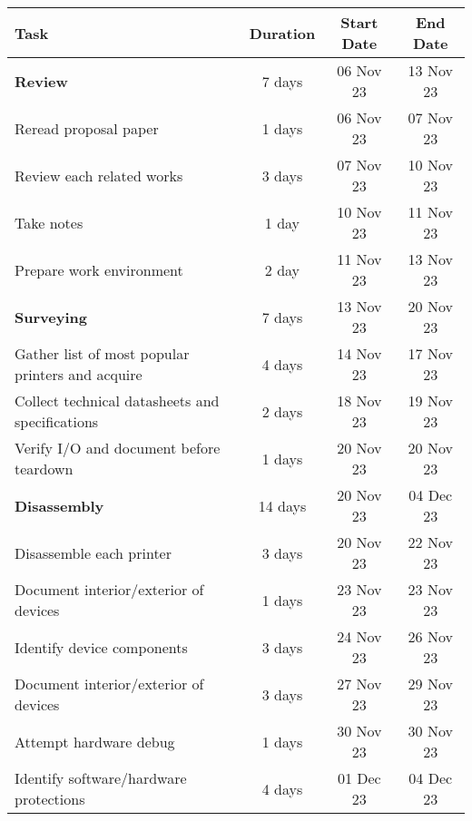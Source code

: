 \begin{table}[h]
  \centering
  \begin{tabular}{ |l||c|c|c| }
    \hline\rowcolor{gray!30}

    \textbf{Task} & \textbf{Duration} & \textbf{Start Date} & \textbf{End Date} \\
  
    \hline


    \hline\rowcolor{gray!10} 

    \textbf{Review} & 7 days & 06 Nov 23 & 13 Nov 23 \\

    Reread proposal paper & 1 days & 06 Nov 23 & 07 Nov 23 \\
    Review each related works & 3 days & 07 Nov 23 & 10 Nov 23 \\
    Take notes & 1 day & 10 Nov 23 & 11 Nov 23 \\
    Prepare work environment & 2 day & 11 Nov 23 & 13 Nov 23 \\

    \hline
    \hline\rowcolor{gray!10} 

    \textbf{Surveying} & 7 days & 13 Nov 23 & 20 Nov 23 \\

    Gather list of most popular printers and acquire & 4 days & 14 Nov 23 & 17 Nov 23 \\
    Collect technical datasheets and specifications & 2 days & 18 Nov 23 & 19 Nov 23 \\
    Verify I/O and document before teardown & 1 days & 20 Nov 23 & 20 Nov 23 \\

    \hline
    \hline\rowcolor{gray!10} 

    \textbf{Disassembly} & 14 days & 20 Nov 23 & 04 Dec 23 \\

    Disassemble each printer & 3 days & 20 Nov 23 & 22 Nov 23 \\
    Document interior/exterior of devices & 1 days & 23 Nov 23 & 23 Nov 23 \\
    Identify device components & 3 days & 24 Nov 23 & 26 Nov 23 \\
    Document interior/exterior of devices & 3 days & 27 Nov 23 & 29 Nov 23 \\
    Attempt hardware debug & 1 days & 30 Nov 23 & 30 Nov 23 \\
    Identify software/hardware protections & 4 days & 01 Dec 23 & 04 Dec 23 \\


\end{tabular}
\end{table}
